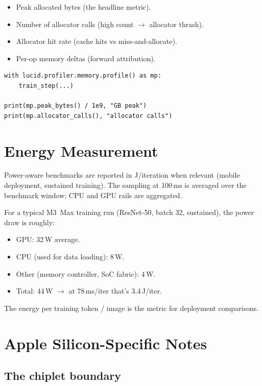 \begin{itemize}
  \item Peak allocated bytes (the headline metric).
  \item Number of allocator calls (high count $\to$ allocator
    thrash).
  \item Allocator hit rate (cache hits vs miss-and-allocate).
  \item Per-op memory deltas (forward attribution).
\end{itemize}

\begin{lstlisting}[style=lucid,language=LucidPython]
with lucid.profiler.memory.profile() as mp:
    train_step(...)

print(mp.peak_bytes() / 1e9, "GB peak")
print(mp.allocator_calls(), "allocator calls")
\end{lstlisting}

\section{Energy Measurement}
\label{sec:perf_methodology:energy}

Power-aware benchmarks are reported in J/iteration when
relevant (mobile deployment, sustained training). The
 sampling at 100\,ms is averaged over the
benchmark window; CPU and GPU rails are aggregated.

For a typical M3~Max training run (ResNet-50, batch 32,
sustained), the power draw is roughly:
\begin{itemize}
  \item GPU: 32\,W average.
  \item CPU (used for data loading): 8\,W.
  \item Other (memory controller, SoC fabric): 4\,W.
  \item Total: 44\,W $\to$ at 78\,ms/iter that's 3.4\,J/iter.
\end{itemize}

The energy per training token / image is the metric for
deployment comparisons.

\section{Apple Silicon-Specific Notes}
\label{sec:perf_methodology:apple_specific}

\subsection{The chiplet boundary}
\label{ssec:perf_methodology:chiplet}

